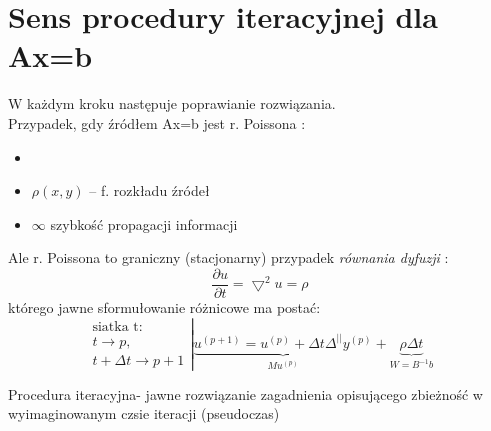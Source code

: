 \section{Sens procedury iteracyjnej dla Ax=b}

\begin{frame}{}
  W każdym kroku następuje poprawianie rozwiązania.\\
  Przypadek, gdy źródłem Ax=b jest r. Poissona :
  \begin{itemize}
    \item {}
    \item $\rho(x,y)$ -- f. rozkładu źródeł
    \item $\infty$ szybkość propagacji informacji
  \end{itemize}
\end{frame}

\begin{frame}{}
  Ale r. Poissona to graniczny (stacjonarny) przypadek \emph{równania dyfuzji} :
  $$\boxed{\frac{\partial u}{\partial t} = \bigtriangledown^2u=\rho}$$
  którego jawne sformułowanie różnicowe ma postać:
  $$
  \left.
  \begin{array}{lr}
    \text{siatka t}:\\
    t\rightarrow p,\\
    t+\Delta t\rightarrow p+1
  \end{array}\right|
  \underbrace{u^{(p+1)}=u^{(p)}+\Delta t\Delta^{||}y^{(p)}}_{Mu^{(p)}}+\underbrace{\rho\Delta t}_{W=B^{-1}b}
  $$
  

  Procedura iteracyjna- jawne rozwiązanie zagadnienia opisującego zbieżność w wyimaginowanym czsie iteracji (pseudoczas)
\end{frame}

